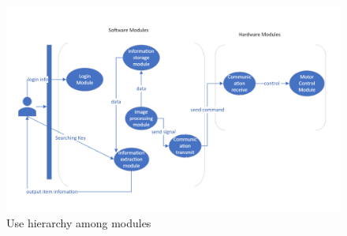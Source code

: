 \documentclass[12pt, titlepage]{article}
\begin{document}
\begin{figure}[H]
\centering
\includegraphics[width=1\textwidth]{UsesHierarchy.png}
\caption{Use hierarchy among modules}
\label{FigUH}
\end{figure}
\end{document}
